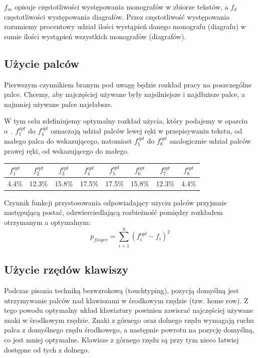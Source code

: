 \documentclass[brudnopis]{xmgr}
\begin{document}
$ f_m $ opisuje częstotliwości występowania monografów w zbiorze tekstów, a $ f_d $ częstotliwości występowania diagrafów. Przez częstotliwość występowania rozumiemy procentowy udział ilości wystąpień danego monografu (diagrafu) w sumie ilości wystąpień wszystkich monografów (diagrafów).


\subsection{Użycie palców}

Pierwszym czynnikiem branym pod uwagę będzie rozkład pracy na poszczególne palce. Chcemy, aby najczęściej używane były najsilniejsze i najdłuższe palce, a najmniej używane palce najsłabsze.

W tym celu zdefiniujemy optymalny rozkład użycia, który podajemy w oparciu o~\cite{AntColony:2002:ACO}. $f^{opt}_1$ do $f^{opt}_4$ oznaczają udział palców lewej ręki w przepisywaniu tekstu, od małego palca do wskazującego, natomiast $f^{opt}_5$ do $f^{opt}_8$ analogicznie udział palców prawej ręki, od wskazującego do małego.\newline

\begin{tabular}{ c | c | c | c | c | c | c | c }
  $f^{opt}_1$ & $f^{opt}_2$ & $f^{opt}_3$ & $f^{opt}_4$ & $f^{opt}_5$ & $f^{opt}_6$ & $f^{opt}_7$ & $f^{opt}_8$ \\
  \hline
  4.4\% & 12.3\% & 15.8\% & 17.5\% & 17.5\% & 15.8\% & 12.3\% & 4.4\% \\
\end{tabular}\newline

Czynnik funkcji przystosowania odpowiadający użyciu palców przyjmnie następującą postać, odzwierciedlającą rozbieżność pomiędzy rozkładem otrzymanym a optymalnym:
$$ p_{finger} = \sum\limits_{i = 1}^{8} (f_i^{opt} - f_i)^2 $$


\subsection{Użycie rzędów klawiszy}

Podczas pisania techniką bezwzrokową (touchtyping), pozycją domyślną jest utrzymywanie palców nad klawiszami w środkowym rzędzie (tzw. home row). Z tego powodu optymalny układ klawiatury powinien zawierać najczęściej używane znaki w środkowym rzędzie. Znaki z górnego oraz dolnego rzędu wymagają ruchu palca z domyślnego rzędu środkowego, a następnie powrotu na pozycję domyślną, co jest mniej optymalne. Klawisze z górnego rzędu są przy tym nieco łatwiej dostępne od tych z dolnego.
\end{document}
